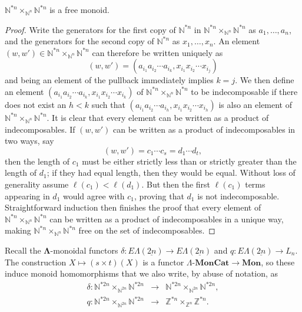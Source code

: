 \documentclass{amsbook} %
\newcommand{\mb}{\mathbf}
\newcommand{\ML}{\mathbf{\Lambda}}
\newcommand{\ELnn}{E\Lambda(\underline{2n})}
\newcommand{\lmc}{\Lambda\mbox{-}\mb{MonCat}}
\newcommand{\mon}{\ensuremath{\mb{Mon}}}
\numberwithin{section}{chapter}
\begin{document}
\begin{lem}\label{freemon} $\mathbb{N}^{\ast n} \times_{\mathbb{N}^n} \mathbb{N}^{\ast n}$ is a free monoid.
\end{lem}
\begin{proof}
Write the generators for the first copy of $\mathbb{N}^{\ast n}$ in $\mathbb{N}^{\ast n} \times_{\mathbb{N}^n} \mathbb{N}^{\ast n}$ as $a_1, \ldots, a_n$, and the generators for the second copy of $\mathbb{N}^{\ast n}$ as $x_1, \ldots, x_n$. An element $(w,w') \in \mathbb{N}^{\ast n} \times_{\mathbb{N}^n} \mathbb{N}^{\ast n}$ can therefore be written uniquely as
\[
(w,w') = (a_{i_1} a_{i_2} \cdots a_{i_k}, x_{i_1} x_{i_2} \cdots x_{i_j})
\]
and being an element of the pullback immediately implies $k=j$. We then define an element $ (a_{i_1} a_{i_2} \cdots a_{i_k}, x_{i_1} x_{i_2} \cdots x_{i_k})$ of $\mathbb{N}^{\ast n} \times_{\mathbb{N}^n} \mathbb{N}^{\ast n}$ to be indecomposable if there does not exist an $h < k$ such that $ (a_{i_1} a_{i_2} \cdots a_{i_h}, x_{i_1} x_{i_2} \cdots x_{i_h})$ is also an element of $\mathbb{N}^{\ast n} \times_{\mathbb{N}^n} \mathbb{N}^{\ast n}$. It is clear that every element can be written as a product of indecomposables. If $(w,w')$ can be written as a product of indecomposables in two ways, say 
\[
(w,w') = c_1 \cdots c_s = d_1 \cdots d_t,
\]
then the length  of $c_1$ must be either strictly less than or strictly greater than the length of $d_1$; if they had equal length, then they would be equal. Without loss of generality assume $\ell(c_1) < \ell(d_1)$. But then the first $\ell(c_1)$ terms appearing in $d_1$ would agree with $c_1$, proving that $d_1$ is not indecomposable. Straightforward induction then finishes the proof that every element of $\mathbb{N}^{\ast n} \times_{\mathbb{N}^n} \mathbb{N}^{\ast n}$ can be written as a product of indecomposables in a unique way, making $\mathbb{N}^{\ast n} \times_{\mathbb{N}^n} \mathbb{N}^{\ast n}$ free on the set of indecomposables.
\end{proof}

Recall the $\ML$-monoidal functors $\delta: \ELnn \to \ELnn$ and $q:\ELnn \to L_n$. The construction $X \mapsto (s \times t)(X)$ is a functor $\lmc \to \mon$, so these induce monoid homomorphisms that we also write, by abuse of notation, as 
\[
\begin{array}{rcl}
\delta: \mathbb{N}^{\ast 2n} \times_{\mathbb{N}^{2n}} \mathbb{N}^{\ast 2n} & \to & \mathbb{N}^{\ast 2n} \times_{\mathbb{N}^{2n}} \mathbb{N}^{\ast 2n}, \\
q: \mathbb{N}^{\ast 2n} \times_{\mathbb{N}^{2n}} \mathbb{N}^{\ast 2n} & \to & \mathbb{Z}^{\ast n} \times_{\mathbb{Z}^n} \mathbb{Z}^{\ast n}. 
\end{array}
\]
\end{document}

